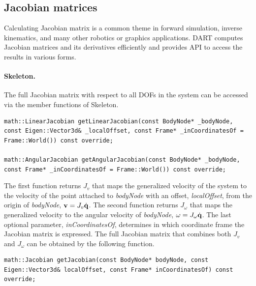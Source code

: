 \subsection{Jacobian matrices}
Calculating Jacobian matrix is a common theme in forward simulation, inverse kinematics, and many other robotics or graphics applications. DART computes Jacobian matrices and its derivatives efficiently and provides API to access the results in various forms. 

\paragraph{Skeleton.} The full Jacobian matrix with respect to all DOFs in the system can be accessed via the member functions of Skeleton.

\begin{lstlisting}[caption=Skeleton.h]
math::LinearJacobian getLinearJacobian(const BodyNode* _bodyNode, const Eigen::Vector3d& _localOffset, const Frame* _inCoordinatesOf = Frame::World()) const override;

math::AngularJacobian getAngularJacobian(const BodyNode* _bodyNode, const Frame* _inCoordinatesOf = Frame::World()) const override;
\end{lstlisting}

The first function returns $J_v$ that maps the generalized velocity of
the system to the velocity of the point attached to \emph{bodyNode}
with an offset, \emph{localOffset}, from the origin of
\emph{bodyNode}, $\mathbf{v} = J_v \dot{\mathbf{q}}$. The second function
returns $J_{\omega}$ that maps the generalized velocity to the angular
velocity of \emph{bodyNode}, $\omega = J_{\omega}\dot{\mathbf{q}}$. The
last optional parameter, \emph{inCoordinatesOf}, determines in which
coordinate frame the Jacobian matrix is expressed. The full Jacobian
matrix that combines both $J_v$ and $J_{\omega}$ can be obtained by
the following function.

\begin{lstlisting}[caption=Skeleton.h]
math::Jacobian getJacobian(const BodyNode* bodyNode, const Eigen::Vector3d& localOffset, const Frame* inCoordinatesOf) const override;
\end{lstlisting}




